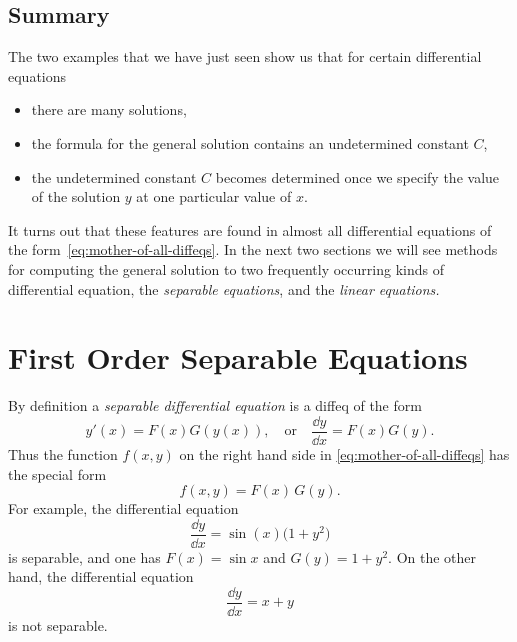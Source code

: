 \subsection{Summary} %
\label{sec:summary-1}
The two examples that we have just seen show us that for certain differential
equations
\begin{itemize}
\item there are many solutions,
\item the formula for the general solution contains an undetermined constant $C$,
\item the undetermined constant $C$ becomes determined once we specify the value of
  the solution $y$ at one particular value of $x$.
\end{itemize}
It turns out that these features are found in almost all differential equations of
the form~\eqref{eq:mother-of-all-diffeqs}.  In the next two sections we will see
methods for computing the general solution to two frequently occurring kinds of
differential equation, the \textit{separable equations}, and the \textit{linear
  equations.}

\section{First Order Separable Equations} %
\label{sec:1storder-separable}
By definition a \emph{separable differential equation} is a diffeq of the form
\begin{equation}
  \label{eq:separable-2}
  y'(x) = F(x) G(y(x)),\quad\text{or}\quad \frac{\dd y}{\dd x} = F(x)G(y).
\end{equation}
Thus the function $f(x,y)$ on the right hand side in
\eqref{eq:mother-of-all-diffeqs} has the special form
\[
  f(x,y) = F(x)\, G(y).
\]
For example, the differential equation 
\[
  \frac{\dd y}{\dd x} = \sin(x) \bigl(1+y^2\bigr)
\]
is separable, and one has $F(x) = \sin x$ and $G(y) = 1+y^2$.
On the other hand, the differential equation
\[
  \frac{\dd y}{\dd x} = x+y
\]
is not separable.

